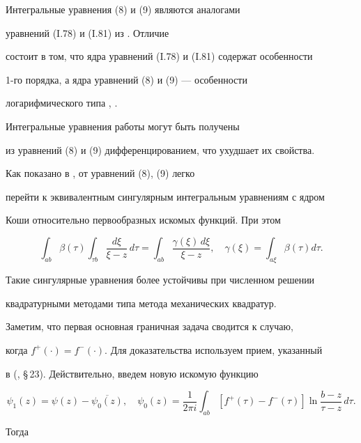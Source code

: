 Интегральные уравнения (8) и (9) являются аналогами


уравнений (I.78) и (I.81) из \cite{Svr.DZUTT}. Отличие


состоит в том, что ядра уравнений (I.78) и (I.81) содержат особенности


1-го порядка, а ядра уравнений (8) и (9) --- особенности


логарифмического типа \cite{PNB.PTIU}, \cite{PNB.92}.


Интегральные уравнения работы \cite{Svr.DZUTT} могут быть получены


из уравнений (8) и (9) дифференцированием, что ухудшает их свойства.


Как показано в \cite{PNB.PTIU}, от уравнений (8), (9) легко


перейти к эквивалентным сингулярным интегральным уравнениям с ядром


Коши относительно первообразных искомых функций. При этом


$$


\int_{ab}\beta(\tau) \int_{\tau b} \frac{d\xi}{\xi-z}\,d\tau =


\int_{ab} \frac{\gamma(\xi)\,d\xi}{\xi-z},\quad


\gamma(\xi)=\int_{a\xi} \beta(\tau)d\tau .


$$


Такие сингулярные уравнения более устойчивы при численном решении


квадратурными методами типа метода механических квадратур.





Заметим, что первая основная граничная задача сводится к случаю,


когда $f^+(\cdot)=f^-(\cdot)$. Для доказательства используем прием, указанный


в (\cite{PP.IUTU}, \S\,23). Действительно, введем новую искомую функцию


$$


\psi_1(z)=\psi(z)-\overline{\psi_0(z)},\quad


\psi_0(z) = \frac{1}{2\pi i}\int_{ab}


[f^+(\tau)-f^-(\tau)]\ln\frac{b-z}{\tau-z}\,d\tau.


$$


Тогда


